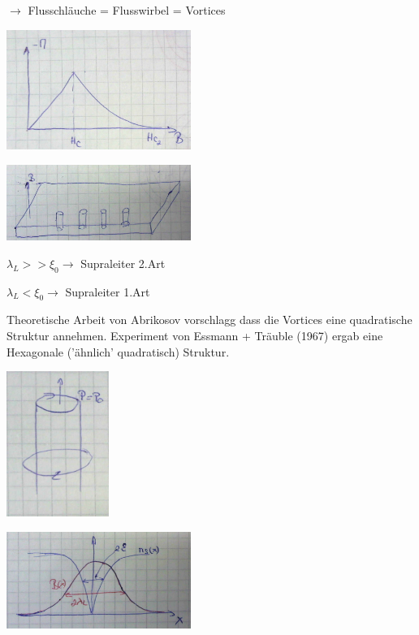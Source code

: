 \(\rightarrow \) Flusschläuche = Flusswirbel = Vortices



\includegraphics[width=0.45\textwidth]{kap13_18.png}


\includegraphics[width=0.45\textwidth]{kap13_19.png}


\(\lambda_L >> \xi_0  \rightarrow \) Supraleiter 2.Art

 \(\lambda_L < \xi_0  \rightarrow \) Supraleiter 1.Art


Theoretische Arbeit von Abrikosov vorschlagg dass die Vortices eine quadratische Struktur annehmen. Experiment von Essmann + Träuble (1967) ergab eine Hexagonale ('ähnlich' quadratisch) Struktur.

\includegraphics[width=0.25\textwidth]{kap13_20.png}

\includegraphics[width=0.45\textwidth]{kap13_21.png}



